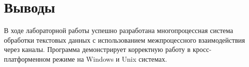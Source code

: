 \section{Выводы}

В ходе лабораторной работы успешно разработана многопроцессная система обработки текстовых данных с использованием межпроцессного взаимодействия через каналы. Программа демонстрирует корректную работу в кросс-платформенном режиме на Windows и Unix системах.

\pagebreak
